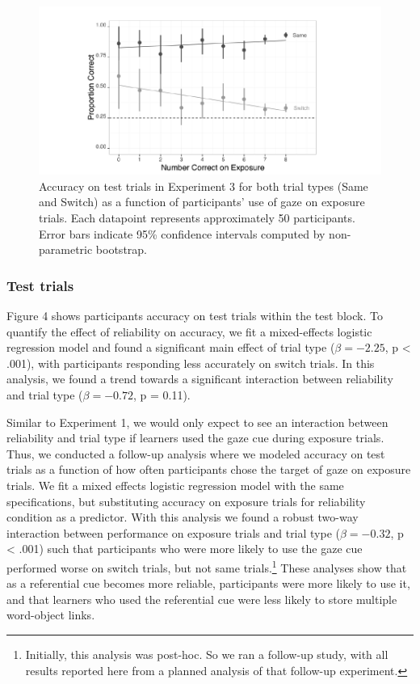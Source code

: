\documentclass[a4paper,man,natbib]{apa6}
\newenvironment{CodeChunk}{}{}
\begin{document}
\begin{CodeChunk}
\begin{figure}
\includegraphics{figs/expt3-plot-1} \caption[Accuracy on test trials in Experiment 3 for both trial types (Same and Switch) as a function of participants' use of gaze on exposure trials]{Accuracy on test trials in Experiment 3 for both trial types (Same and Switch) as a function of participants' use of gaze on exposure trials. Each datapoint represents approximately 50 participants. Error bars indicate 95\% confidence intervals computed by non-parametric bootstrap.}\label{fig:expt3-plot}
\end{figure}
\end{CodeChunk}

\subsubsection{Test trials}\label{test-trials-2}

Figure 4 shows participants accuracy on test trials within the test
block. To quantify the effect of reliability on accuracy, we fit a
mixed-effects logistic regression model and found a significant main
effect of trial type (\(\beta = -2.25\), p \textless{} .001), with
participants responding less accurately on switch trials. In this
analysis, we found a trend towards a significant interaction between
reliability and trial type (\(\beta = -0.72\), p = 0.11).

Similar to Experiment 1, we would only expect to see an interaction
between reliability and trial type if learners used the gaze cue during
exposure trials. Thus, we conducted a follow-up analysis where we
modeled accuracy on test trials as a function of how often participants
chose the target of gaze on exposure trials. We fit a mixed effects
logistic regression model with the same specifications, but substituting
accuracy on exposure trials for reliability condition as a predictor.
With this analysis we found a robust two-way interaction between
performance on exposure trials and trial type (\(\beta = -0.32\), p
\textless{} .001) such that participants who were more likely to use the
gaze cue performed worse on switch trials, but not same
trials.\footnote{Initially, this analysis was post-hoc. So we ran a follow-up study, with all results reported here from a planned analysis of that follow-up experiment.}
These analyses show that as a referential cue becomes more reliable,
participants were more likely to use it, and that learners who used the
referential cue were less likely to store multiple word-object links.
\end{document}
